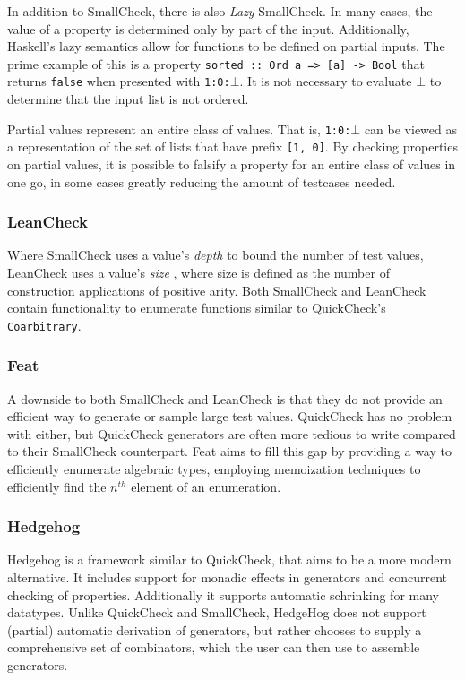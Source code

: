 \documentclass[a4paper,msc,twosized=semi]{uustthesis}
\begin{document}
  In addition to SmallCheck, there is also \textit{Lazy} SmallCheck. In many cases, 
  the value of a property is determined only by part of the input. Additionally, 
  Haskell's lazy semantics allow for functions to be defined on partial inputs. The 
  prime example of this is a property \texttt{sorted :: Ord a => [a] -> Bool} that 
  returns \texttt{false} when presented with \texttt{1:0:$\bot$}. It is not necessary 
  to evaluate $\bot$ to determine that the input list is not ordered. 

  Partial values represent an entire class of values. That is, \texttt{1:0:$\bot$} can 
  be viewed as a representation of the set of lists that have prefix \texttt{[1, 0]}. 
  By checking properties on partial values, it is possible to falsify a property for 
  an entire class of values in one go, in some cases greatly reducing the amount of 
  testcases needed. 

\subsubsection{LeanCheck} 

  Where SmallCheck uses a value's \textit{depth} to bound the number of test values, 
  LeanCheck uses a value's \textit{size} \cite{matela2017tools}, where size is defined 
  as the number of construction applications of positive arity. Both SmallCheck and 
  LeanCheck contain functionality to enumerate functions similar to QuickCheck's 
  \texttt{Coarbitrary}. 

\subsubsection{Feat}

  A downside to both SmallCheck and LeanCheck is that they do not provide an efficient 
  way to generate or sample large test values. QuickCheck has no problem with either, 
  but QuickCheck generators are often more tedious to write compared to their 
  SmallCheck counterpart. Feat \cite{duregaard2013feat} aims to fill this gap by 
  providing a way to efficiently enumerate algebraic types, employing memoization 
  techniques to efficiently find the $n^{th}$ element of an enumeration. 

\subsubsection{Hedgehog}

  Hedgehog \cite{hedgehog} is a framework similar to QuickCheck, that aims to be a 
  more modern alternative. It includes support for monadic effects in generators and 
  concurrent checking of properties. Additionally it supports automatic schrinking for many datatypes. Unlike QuickCheck and SmallCheck, HedgeHog does not support (partial) automatic derivation of generators, but rather chooses to supply a comprehensive set of combinators, which the user can then use to assemble generators.
\end{document}
